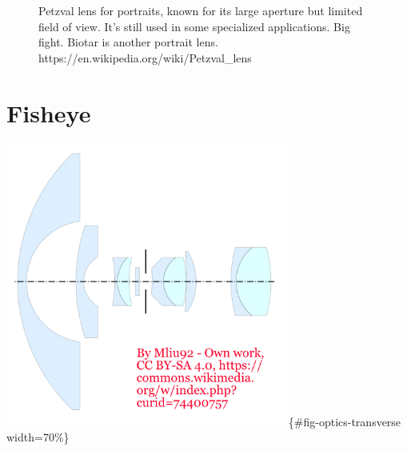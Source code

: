 \documentclass[
  letterpaper,
]{book}
\begin{document}
\begin{figure}


\caption{\label{fig-optics-notransverse}Petzval lens for portraits,
known for its large aperture but limited field of view. It's still used
in some specialized applications. Big fight. Biotar is another portrait
lens. https://en.wikipedia.org/wiki/Petzval\_lens}

\end{figure}%

\chapter{Fisheye}

\includegraphics[width=0.7\textwidth,height=\textheight]{chapters/images/optics/09-morelens/fisheye-wikipedia.png}\{\#fig-optics-transverse
width=70\%\}
\end{document}
